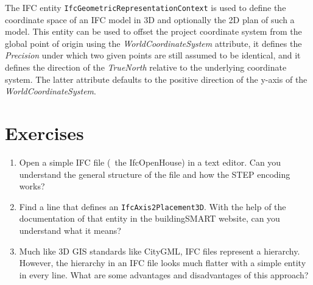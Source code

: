 The IFC entity \texttt{IfcGeometricRepresentationContext} is used to define the coordinate space of an IFC model in 3D and optionally the 2D plan of such a model.
This entity can be used to offset the project coordinate system from the global point of origin using the \emph{WorldCoordinateSystem} attribute, it defines the \emph{Precision} under which two given points are still assumed to be identical, and it defines the direction of the \emph{TrueNorth} relative to the underlying coordinate system.
The latter attribute defaults to the positive direction of the y-axis of the \emph{WorldCoordinateSystem}.

\section{Exercises}

\begin{enumerate}

\item
Open a simple IFC file (\eg\ the IfcOpenHouse) in a text editor.
Can you understand the general structure of the file and how the STEP encoding works? 

\item
Find a line that defines an \texttt{IfcAxis2Placement3D}.
With the help of the documentation of that entity in the buildingSMART website, can you understand what it means?

\item
Much like 3D GIS standards like CityGML, IFC files represent a hierarchy.
However, the hierarchy in an IFC file looks much flatter with a simple entity in every line.
What are some advantages and disadvantages of this approach?

\end{enumerate}

%









